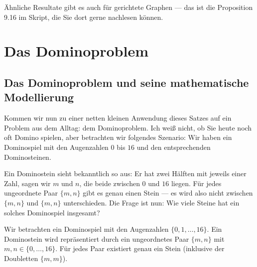 \begin{spoken-clean}[00:18:56 - 00:20:20]
Ähnliche Resultate gibt es auch für gerichtete Graphen --- das ist die Proposition 9.16 im Skript, die Sie dort gerne nachlesen können.
\end{spoken-clean}

\begin{math-stroke}
\end{math-stroke}

\section{Das Dominoproblem}

\subsection{Das Dominoproblem und seine mathematische Modellierung}

\begin{spoken-clean}[00:20:20 - 00:22:30]
Kommen wir nun zu einer netten kleinen Anwendung dieses Satzes auf ein Problem aus dem Alltag: dem Dominoproblem. Ich weiß nicht, ob Sie heute noch oft Domino spielen, aber betrachten wir folgendes Szenario: Wir haben ein Dominospiel mit den Augenzahlen $0$ bis $16$ und den entsprechenden Dominosteinen.

Ein Dominostein sieht bekanntlich so aus: Er hat zwei Hälften mit jeweils einer Zahl, sagen wir $m$ und $n$, die beide zwischen $0$ und $16$ liegen. Für jedes ungeordnete Paar $\{m, n\}$ gibt es genau einen Stein --- es wird also nicht zwischen $\{m, n\}$ und $\{m, n\}$ unterschieden. Die Frage ist nun: Wie viele Steine hat ein solches Dominospiel insgesamt?
\end{spoken-clean}

\begin{math-stroke}
Wir betrachten ein Dominospiel mit den Augenzahlen $\{0, 1, \dots, 16\}$.
Ein Dominostein wird repräsentiert durch ein ungeordnetes Paar $\{m, n\}$ mit $m, n \in \{0, \dots, 16\}$. Für jedes Paar existiert genau ein Stein (inklusive der Doubletten $\{m, m\}$).
\end{math-stroke}

